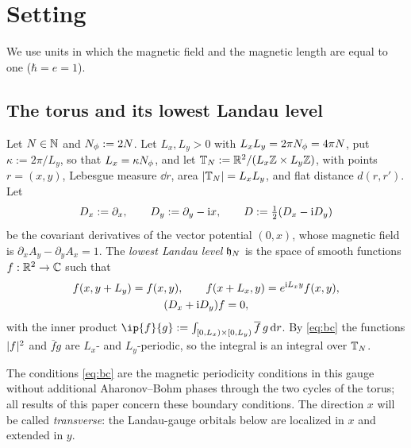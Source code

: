 \section{Setting}\label{sec:setting}

We use units in which the magnetic field and the magnetic length are equal to one ($\hbar=e=1$).

\subsection{The torus and its lowest Landau level}

\begin{definition}\label{def:torus}
Let $N\in\mathbb{N}$ and $N_{\phi}:=2N$. Let $L_x,L_y>0$ with $L_xL_y=2\pi N_{\phi}=4\pi N$, put $\kappa:=2\pi/L_y$, so that
$L_x=\kappa N_{\phi}$, and let $\mathbb{T}_N:=\mathbb{R}^2/(L_x\mathbb{Z}\times L_y\mathbb{Z})$, with points $r=(x,y)$, Lebesgue measure
$\dd r$, area $\lvert\mathbb{T}_N\rvert=L_xL_y$, and flat distance $d(r,r')$. Let
\begin{equation}\label{eq:covariant}
D_x:=\partial_x,\qquad D_y:=\partial_y-\mathrm{i} x,\qquad D:=\tfrac12(D_x-\mathrm{i} D_y)
\end{equation}
be the covariant derivatives of the vector potential $(0,x)$, whose magnetic field is
$\partial_xA_y-\partial_yA_x=1$. The \emph{lowest Landau level} $\mathfrak{h}_N$ is the space of smooth functions
$f:\mathbb{R}^2\to\mathbb{C}$ such that
\begin{gather}
f(x,y+L_y)=f(x,y),\qquad f(x+L_x,y)=e^{\mathrm{i} L_xy}f(x,y), \label{eq:bc}\\
(D_x+\mathrm{i} D_y)f=0, \label{eq:lll}
\end{gather}
with the inner product $\ip{f}{g}:=\int_{[0,L_x)\times[0,L_y)}\overline{f}\,g\,\dd r$. By \eqref{eq:bc} the
functions $\lvert f\rvert^2$ and $\overline fg$ are $L_x$- and $L_y$-periodic, so the integral is an integral over
$\mathbb{T}_N$.
\end{definition}

The conditions \eqref{eq:bc} are the magnetic periodicity conditions in this gauge without additional
Aharonov--Bohm phases through the two cycles of the torus; all results of this paper concern these
boundary conditions. The direction $x$ will be called \emph{transverse}: the Landau-gauge orbitals below are
localized in $x$ and extended in $y$.

